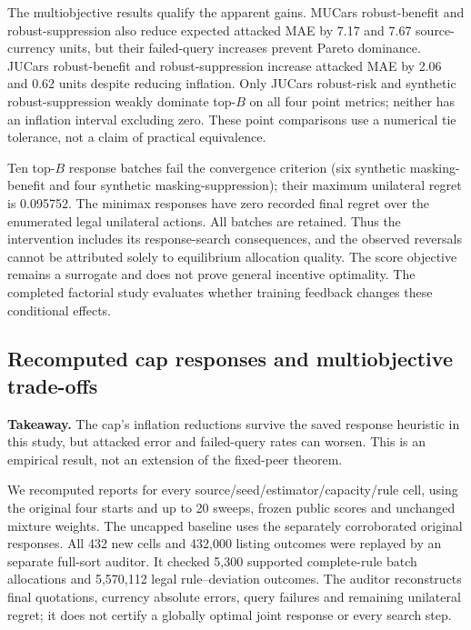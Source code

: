 \documentclass[11pt]{article}
\begin{document}
The multiobjective results qualify the apparent gains. MUCars robust-benefit
and robust-suppression also reduce expected attacked MAE by 7.17 and 7.67
source-currency units, but their failed-query increases prevent Pareto
dominance. JUCars robust-benefit and robust-suppression increase attacked MAE
by 2.06 and 0.62 units despite reducing inflation. Only JUCars robust-risk and
synthetic robust-suppression weakly dominate top-$B$ on all four point metrics;
neither has an inflation interval excluding zero. These point comparisons use
a numerical tie tolerance, not a claim of practical equivalence.

Ten top-$B$ response batches fail the convergence criterion (six synthetic
masking-benefit and four synthetic masking-suppression); their maximum
unilateral regret is 0.095752. The minimax responses have zero recorded final
regret over the enumerated legal unilateral actions. All batches are retained.
Thus the intervention includes its response-search consequences, and the
observed reversals cannot be attributed solely to equilibrium allocation quality.
The score objective remains a surrogate and does not prove general incentive
optimality. The completed factorial study evaluates whether training feedback changes these
conditional effects.

\subsection{Recomputed cap responses and multiobjective trade-offs}
\noindent\textbf{Takeaway.} The cap's inflation reductions survive the saved
response heuristic in this study, but attacked error and failed-query rates
can worsen. This is an empirical result, not an extension of the fixed-peer theorem.

We recomputed reports for every source/seed/estimator/capacity/rule cell, using
the original four starts and up to 20 sweeps, frozen public scores and unchanged
mixture weights. The uncapped baseline uses the separately corroborated original
responses. All 432 new cells and 432,000 listing outcomes were replayed by an
separate full-sort auditor. It checked 5,300 supported complete-rule batch
allocations and 5,570,112 legal rule--deviation outcomes. The auditor reconstructs
final quotations, currency absolute errors, query failures and remaining unilateral
regret; it does not certify a globally optimal joint response or every search step.
\end{document}
